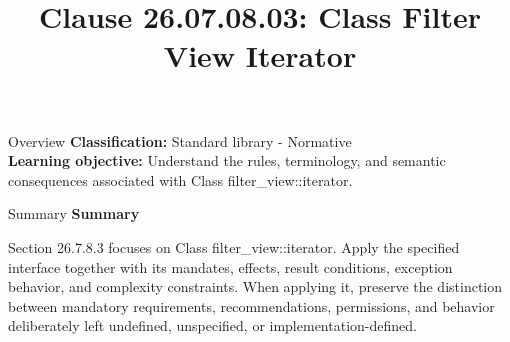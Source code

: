 \documentclass[10pt,letterpaper]{article}
\title{Clause 26.07.08.03: Class Filter View Iterator}
\author{}
\date{}
\begin{document}
\maketitle
\begin{CornellOverviewBox}{Overview}
\textbf{Classification:} Standard library - Normative\\[2pt]
\textbf{Learning objective:} Understand the rules, terminology, and semantic consequences associated with Class filter\_view::iterator.
\end{CornellOverviewBox}\begin{CornellSummaryBox}{Summary}
{\sffamily\bfseries\color{Accent} Summary}\par\vspace{3pt}Section 26.7.8.3 focuses on Class filter\_view::iterator. Apply the specified interface together with its mandates, effects, result conditions, exception behavior, and complexity constraints. When applying it, preserve the distinction between mandatory requirements, recommendations, permissions, and behavior deliberately left undefined, unspecified, or implementation-defined.
\end{CornellSummaryBox}
\end{document}
